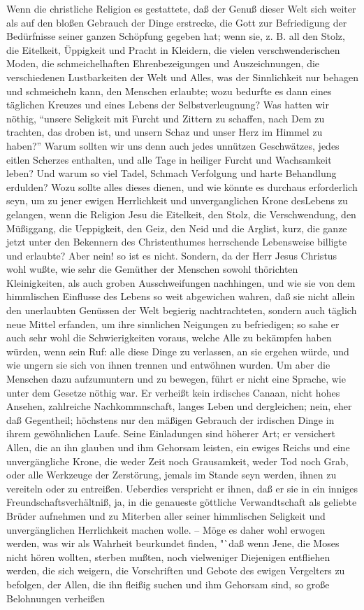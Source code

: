 Wenn die christliche Religion es gestattete, daß der Genuß dieser Welt sich weiter als auf den bloßen Gebrauch der Dinge erstrecke, die Gott zur Befriedigung der Bedürfnisse seiner ganzen Schöpfung gegeben hat; wenn sie, z. B. all den Stolz, die Eitelkeit, Üppigkeit und Pracht in Kleidern, die vielen verschwenderischen Moden, die schmeichelhaften Ehrenbezeigungen und Auszeichnungen, die verschiedenen Lustbarkeiten der Welt und Alles, was der Sinnlichkeit nur behagen und schmeicheln kann, den Menschen erlaubte; wozu bedurfte es dann eines täglichen Kreuzes und eines Lebens der Selbstverleugnung? Was hatten wir nöthig, "`unsere Seligkeit mit Furcht und Zittern zu schaffen, nach Dem zu trachten, das droben ist, und unsern Schaz und unser Herz im Himmel zu haben?"' Warum sollten wir uns denn auch jedes unnützen Geschwätzes, jedes eitlen Scherzes enthalten, und alle Tage in heiliger Furcht und Wachsamkeit leben? Und warum so viel Tadel, Schmach Verfolgung und harte Behandlung erdulden? Wozu sollte alles dieses dienen, und wie könnte es durchaus erforderlich seyn, um zu jener ewigen Herrlichkeit und unverganglichen Krone desLebens zu gelangen, wenn die Religion Jesu die Eitelkeit, den Stolz, die Verschwendung, den Müßiggang, die Ueppigkeit, den Geiz, den Neid und die Arglist, kurz, die ganze jetzt unter den Bekennern des Christenthumes herrschende Lebensweise billigte und erlaubte? Aber nein! so ist es nicht. Sondern, da der Herr Jesus Christus wohl wußte, wie sehr die Gemüther der Menschen sowohl thörichten Kleinigkeiten, als auch groben Ausschweifungen nachhingen, und wie sie von dem himmlischen Einflusse des Lebens so weit abgewichen wahren, daß sie nicht allein den unerlaubten Genüssen der Welt begierig nachtrachteten, sondern auch täglich neue Mittel erfanden, um ihre sinnlichen Neigungen zu befriedigen; so sahe er auch sehr wohl die Schwierigkeiten voraus, welche Alle zu bekämpfen haben würden, wenn sein Ruf: alle diese Dinge zu verlassen, an sie ergehen würde, und wie ungern sie sich von ihnen trennen und entwöhnen wurden. Um aber die Menschen dazu aufzumuntern und zu bewegen, führt er nicht eine Sprache, wie unter dem Gesetze nöthig war. Er verheißt kein irdisches Canaan, nicht hohes Ansehen, zahlreiche Nachkommnschaft, langes Leben und dergleichen; nein, eher daß Gegentheil; höchstens nur den mäßigen Gebrauch der irdischen Dinge in ihrem gewöhnlichen Laufe. Seine Einladungen sind höherer Art; er versichert Allen, die an ihn glauben und ihm Gehorsam leisten, ein ewiges Reichs und eine unvergängliche Krone, die weder Zeit noch Grausamkeit, weder Tod noch Grab, oder alle Werkzeuge der Zerstörung, jemals im Stande seyn werden, ihnen zu vereiteln oder zu entreißen. Ueberdies verspricht er ihnen, daß er sie in ein inniges Freundschaftsverhältniß, ja, in die genaueste göttliche Verwandtschaft als geliebte Brüder aufnehmen und zu Miterben aller seiner himmlischen Seligkeit und unvergänglichen Herrlichkeit machen wolle. -- Möge es daher wohl erwogen werden, was wir als Wahrheit beurkundet finden, "`daß wenn Jene, die Moses nicht hören wollten, sterben mußten, noch vielweniger Diejenigen entfliehen werden, die sich weigern, die Vorschriften und Gebote des ewigen Vergelters zu befolgen, der Allen, die ihn fleißig suchen und ihm Gehorsam sind, so große Belohnungen verheißen 